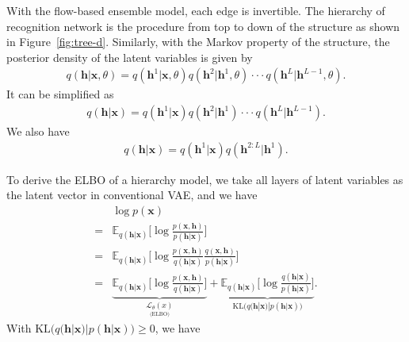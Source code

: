 \documentclass[conference]{IEEEtran}
\begin{document}
With the flow-based ensemble model, each edge is invertible.   The hierarchy of recognition network is the procedure from top to down of the structure as shown in Figure~\ref{fig:tree-d}.  Similarly, with the Markov property of the structure, the posterior density of the latent 
variables is given by
\begin{align*}
q(\mathbf{h}| \mathbf{x}, \theta ) = q(\mathbf{h}^1 | \mathbf{x}, \theta)  q(\mathbf{h}^2 | \mathbf{h}^1, \theta) \cdot \cdot  \cdot  q(\mathbf{h}^{L} | \mathbf{h}^{L-1}, \theta) .
\end{align*}
It can be simplified as 
\begin{align*}
q(\mathbf{h}| \mathbf{x}) = q(\mathbf{h}^1 | \mathbf{x})  q(\mathbf{h}^2 | \mathbf{h}^1) \cdot \cdot  \cdot  q(\mathbf{h}^{L} | \mathbf{h}^{L-1}) .
\end{align*}
We also have 
\begin{align} \label{eq:chain}
q(\mathbf{h}| \mathbf{x}) = q(\mathbf{h}^1 | \mathbf{x})  q(\mathbf{h}^{2:L} | \mathbf{h}^1) .
\end{align}

To derive the ELBO of a hierarchy model, we take all  layers of latent variables as the latent vector in conventional VAE, and we have 
\begin{align*}
&\log p(\mathbf{x})\\
=&  \mathbb{E}_{q(\mathbf{h} | \mathbf{x})} \bigg[ \log  \frac{p(\mathbf{x}, \mathbf{h})}{p(\mathbf{h}|\mathbf{x})} \bigg] \\
=&  \mathbb{E}_{q(\mathbf{h} | \mathbf{x})} \bigg[ \log  \frac{p(\mathbf{x}, \mathbf{h})}{q(\mathbf{h}|\mathbf{x})}   \frac{q(\mathbf{x}, \mathbf{h})}{p(\mathbf{h}|\mathbf{x})} \bigg] \\
=&  \underbrace{\mathbb{E}_{q(\mathbf{h} | \mathbf{x})} \bigg[ \log  \frac{p(\mathbf{x}, \mathbf{h})}{q(\mathbf{h}|\mathbf{x})}  \bigg]}_{\underset{\text{(ELBO)}}{\mathcal{L}_{\theta}(x)}} +   \underbrace{\mathbb{E}_{q(\mathbf{h} | \mathbf{x})} \bigg[ \log \frac{q(\mathbf{h} |\mathbf{x})}{p(\mathbf{h}|\mathbf{x})} \bigg]}_{\text{KL}\big(q(\mathbf{h} |\mathbf{x}) | p(\mathbf{h}|\mathbf{x})\big)} .
\end{align*}
With $\text{KL}\big(q(\mathbf{h} |\mathbf{x}) | p(\mathbf{h}|\mathbf{x})\big) \geq 0$, we have 
\end{document}
